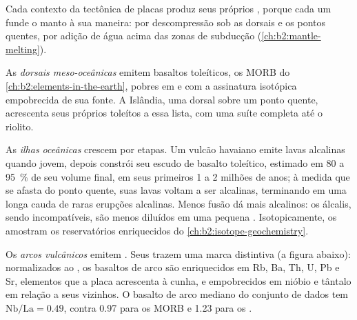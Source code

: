 Cada contexto da tectônica de placas produz seus próprios , porque cada um funde o
manto à sua maneira: por descompressão sob as dorsais e os pontos quentes, por adição de água
acima das zonas de subducção (\cref{ch:b2:mantle-melting}).

As \emph{dorsais meso-oceânicas} emitem basaltos toleíticos, os MORB do
\cref{ch:b2:elements-in-the-earth}, pobres em  e com a
assinatura isotópica empobrecida de sua fonte. A Islândia, uma dorsal sobre um ponto quente, acrescenta
seus próprios toleítos a essa lista, com uma suíte completa até o riolito.

As \emph{ilhas oceânicas} crescem por etapas. Um vulcão havaiano emite lavas alcalinas quando
jovem, depois constrói seu escudo de basalto toleítico, estimado em 80 a
\qty{95}{\percent} de seu volume final, em seus primeiros 1 a 2 milhões de anos; à medida que
se afasta do ponto quente, suas lavas voltam a ser alcalinas, terminando em uma longa cauda de
raras erupções alcalinas. Menos fusão dá  mais alcalinos: os álcalis, sendo
incompatíveis, são menos diluídos em uma pequena . Isotopicamente, os  amostram os reservatórios enriquecidos do \cref{ch:b2:isotope-geochemistry}.

Os \emph{arcos vulcânicos} emitem . Seus  trazem uma
marca distintiva (a figura abaixo): normalizados ao , os basaltos
de arco são enriquecidos em Rb, Ba, Th, U, Pb e Sr, elementos que a placa acrescenta à
cunha, e empobrecidos em nióbio e tântalo em relação a seus vizinhos. O basalto de arco
mediano do conjunto de dados tem $\mathrm{Nb}/\mathrm{La} = 0.49$, contra 0.97 para os MORB
e 1.23 para os .

